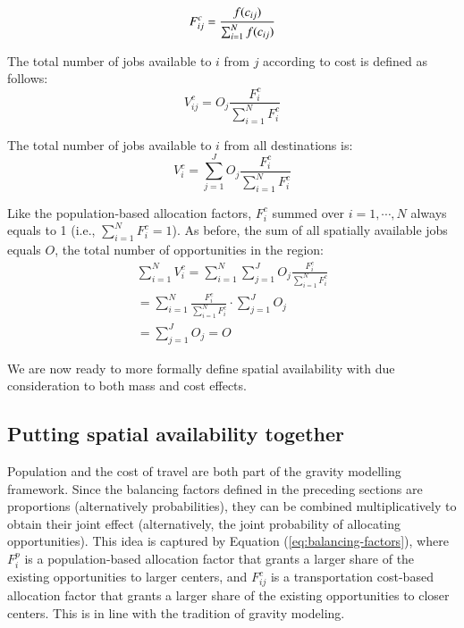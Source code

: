 \documentclass[]{elsarticle} %
\begin{document}
\begin{equation}
\label{eq:tcost-alloc-factor}
F^c_{ij} = \frac{f(c_{ij})}{\sum_{i=1}^N f(c_{ij})}\\
\end{equation}

The total number of jobs available to \(i\) from \(j\) according to cost
is defined as follows: \[
V^c_{ij} = O_j\frac{F^c_{i}}{\sum_{i=1}^N F^c_{i}}
\]

The total number of jobs available to \(i\) from all destinations is: \[
V^c_{i} = \sum_{j=1}^J O_j\frac{F^c_{i}}{\sum_{i=1}^N F^c_{i}}
\]

Like the population-based allocation factors, \(F^c_{i}\) summed over
\(i=1,\cdots,N\) always equals to 1 (i.e.,
\(\sum_{i=1}^{N} F^c_{i} = 1\)). As before, the sum of all spatially
available jobs equals \(O\), the total number of opportunities in the
region: \[
\begin{array}{l}
\sum_{i=1}^N V^c_i =\sum_{i=1}^N\sum_{j=1}^JO_j\frac{F^c_{i}}{\sum_{i=1}^N F^c_{i}}\\
=\sum_{i=1}^N \frac{F^c_{i}}{\sum_{i=1}^N F^c_{i}}\cdot\sum_{j=1}^JO_j\\
=\sum_{j=1}^J O_j = O
\end{array}
\]

We are now ready to more formally define spatial availability with due
consideration to both mass and cost effects.

\hypertarget{putting-spatial-availability-together}{%
\subsection{Putting spatial availability
together}\label{putting-spatial-availability-together}}

Population and the cost of travel are both part of the gravity modelling
framework. Since the balancing factors defined in the preceding sections
are proportions (alternatively probabilities), they can be combined
multiplicatively to obtain their joint effect (alternatively, the joint
probability of allocating opportunities). This idea is captured by
Equation (\ref{eq:balancing-factors}), where \(F^p_{i}\) is a
population-based allocation factor that grants a larger share of the
existing opportunities to larger centers, and \(F^c_{ij}\) is a
transportation cost-based allocation factor that grants a larger share
of the existing opportunities to closer centers. This is in line with
the tradition of gravity modeling.
\end{document}
